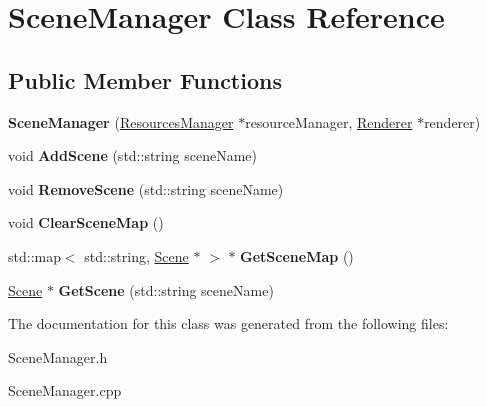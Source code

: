\hypertarget{class_scene_manager}{\section{Scene\-Manager Class Reference}
\label{class_scene_manager}
}
\subsection*{Public Member Functions}
\begin{DoxyCompactItemize}
\item 
\hypertarget{class_scene_manager_ac3d666d894a8d50b595beffbac6863d1}{{\bfseries Scene\-Manager} (\hyperlink{class_resources_manager}{Resources\-Manager} $\ast$resource\-Manager, \hyperlink{class_renderer}{Renderer} $\ast$renderer)}\label{class_scene_manager_ac3d666d894a8d50b595beffbac6863d1}

\item 
\hypertarget{class_scene_manager_a3c75e6a3e33ce869961dcd0f19b4d096}{void {\bfseries Add\-Scene} (std\-::string scene\-Name)}\label{class_scene_manager_a3c75e6a3e33ce869961dcd0f19b4d096}

\item 
\hypertarget{class_scene_manager_abd662dc0303a2d5e2408cf806e64376b}{void {\bfseries Remove\-Scene} (std\-::string scene\-Name)}\label{class_scene_manager_abd662dc0303a2d5e2408cf806e64376b}

\item 
\hypertarget{class_scene_manager_a144b0ee91bcd4bcb528128ce06804571}{void {\bfseries Clear\-Scene\-Map} ()}\label{class_scene_manager_a144b0ee91bcd4bcb528128ce06804571}

\item 
\hypertarget{class_scene_manager_a88d0e3b9c580f95ef6b054a993f26958}{std\-::map$<$ std\-::string, \hyperlink{class_scene}{Scene} $\ast$ $>$ $\ast$ {\bfseries Get\-Scene\-Map} ()}\label{class_scene_manager_a88d0e3b9c580f95ef6b054a993f26958}

\item 
\hypertarget{class_scene_manager_a6cca5d4f056f1d5acf17ac324a81f513}{\hyperlink{class_scene}{Scene} $\ast$ {\bfseries Get\-Scene} (std\-::string scene\-Name)}\label{class_scene_manager_a6cca5d4f056f1d5acf17ac324a81f513}

\end{DoxyCompactItemize}


The documentation for this class was generated from the following files\-:\begin{DoxyCompactItemize}
\item 
Scene\-Manager.\-h\item 
Scene\-Manager.\-cpp\end{DoxyCompactItemize}
